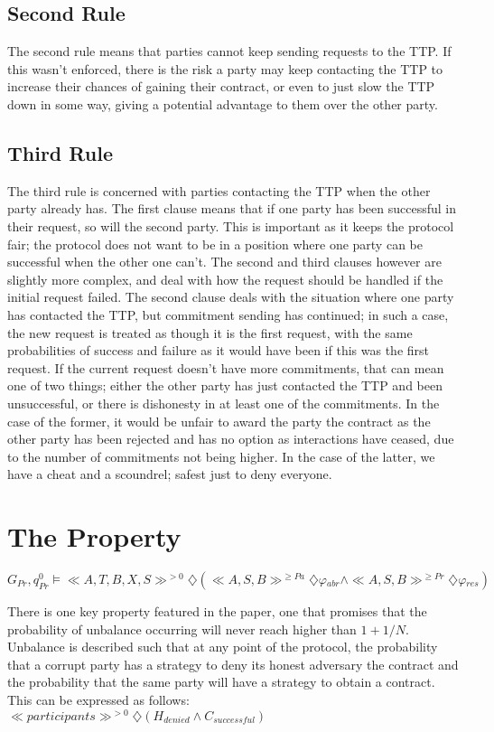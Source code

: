 \documentclass{l4proj}
\begin{document}
\subsection{Second Rule}
The second rule means that parties cannot keep sending requests to the TTP. If this wasn't enforced, there is the risk a party may keep contacting the TTP  to increase their chances of gaining their contract, or even to just slow the TTP down in some way, giving a potential advantage to them over the other party.

\subsection{Third Rule}
The third rule is concerned with parties contacting the TTP when the other party already has. The first clause means that if one party has been successful in their request, so will the second party. This is important as it keeps the protocol fair; the protocol does not want to be in a position where one party can be successful when the other one can't. The second and third clauses however are slightly more complex, and deal with how the request should be handled if the initial request failed. The second clause deals with the situation where one party has contacted the TTP, but commitment sending has continued; in such a case, the new request is treated as though it is the first request, with the same probabilities of success and failure as it would have been if this was the first request.
If the current request doesn't have more commitments, that can mean one of two things; either the other party has just contacted the TTP and been unsuccessful, or there is dishonesty in at least one of the commitments. In the case of the former, it would be unfair to award the party the contract as the other party has been rejected and has no option as interactions have ceased, due to the number of commitments not being higher. In the case of the latter, we have a cheat and a scoundrel; safest just to deny everyone.

\section{The Property}

\centerline{$ G{_{Pr}},q_{Pr}^{0}\models  \ll A, T, B, X, S \gg ^{>0} \diamondsuit (\ll A, S, B \gg^{\ge Pa} \diamondsuit \varphi{_{abr}}  \wedge \ll A, S, B \gg^{\ge Pr} \diamondsuit \varphi{_{res}}) $}

There is one key property featured in the paper, one that promises that the probability of unbalance occurring will never reach higher than $1+1/N$. Unbalance is described such that at any point of the protocol, the probability that a corrupt party has a strategy to deny its honest adversary the contract and the probability that the same party will have a strategy to obtain a contract. This can be expressed as follows:\\
$\ll participants \gg ^{>0} \diamondsuit (H_{denied}  \wedge C_{successful}) $
\end{document}
